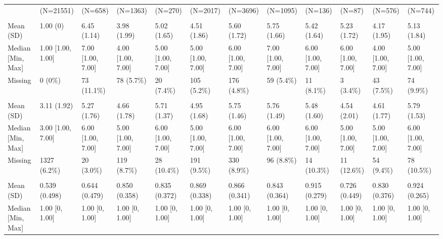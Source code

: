 \documentclass[
  single column]{article}
\begin{document}
\begin{landscape}
\begin{longtable}[t]{llllllllllll}
\endfoot
\bottomrule
\endlastfoot
 & (N=21551) & (N=658) & (N=1363) & (N=270) & (N=2017) & (N=3696) & (N=1095) & (N=136) & (N=87) & (N=576) & (N=744)\\
\addlinespace[0.3em]
\multicolumn{12}{l}{\textbf{Religious Identification Level}}\\
\hspace{1em}Mean (SD) & 1.00 (0) & 6.45 (1.14) & 3.98 (1.99) & 5.02 (1.65) & 4.51 (1.86) & 5.60 (1.72) & 5.75 (1.66) & 5.42 (1.64) & 5.23 (1.72) & 4.17 (1.95) & 5.13 (1.84)\\
\hspace{1em}Median [Min, Max] & 1.00 [1.00, 1.00] & 7.00 [1.00, 7.00] & 4.00 [1.00, 7.00] & 5.00 [1.00, 7.00] & 5.00 [1.00, 7.00] & 6.00 [1.00, 7.00] & 7.00 [1.00, 7.00] & 6.00 [1.00, 7.00] & 6.00 [1.00, 7.00] & 4.00 [1.00, 7.00] & 5.00 [1.00, 7.00]\\
\hspace{1em}Missing & 0 (0\%) & 73 (11.1\%) & 78 (5.7\%) & 20 (7.4\%) & 105 (5.2\%) & 176 (4.8\%) & 59 (5.4\%) & 11 (8.1\%) & 3 (3.4\%) & 43 (7.5\%) & 74 (9.9\%)\\
\addlinespace[0.3em]
\multicolumn{12}{l}{\textbf{Spiritual Identification Level}}\\
\hspace{1em}Mean (SD) & 3.11 (1.92) & 5.27 (1.76) & 4.66 (1.78) & 5.71 (1.37) & 4.95 (1.68) & 5.75 (1.46) & 5.76 (1.49) & 5.48 (1.60) & 4.54 (2.01) & 4.61 (1.77) & 5.79 (1.53)\\
\hspace{1em}Median [Min, Max] & 3.00 [1.00, 7.00] & 6.00 [1.00, 7.00] & 5.00 [1.00, 7.00] & 6.00 [1.00, 7.00] & 5.00 [1.00, 7.00] & 6.00 [1.00, 7.00] & 6.00 [1.00, 7.00] & 6.00 [1.00, 7.00] & 5.00 [1.00, 7.00] & 5.00 [1.00, 7.00] & 6.00 [1.00, 7.00]\\
\hspace{1em}Missing & 1327 (6.2\%) & 20 (3.0\%) & 119 (8.7\%) & 28 (10.4\%) & 191 (9.5\%) & 330 (8.9\%) & 96 (8.8\%) & 14 (10.3\%) & 11 (12.6\%) & 54 (9.4\%) & 78 (10.5\%)\\
\addlinespace[0.3em]
\multicolumn{12}{l}{\textbf{Belief in Spirit}}\\
\hspace{1em}Mean (SD) & 0.539 (0.498) & 0.644 (0.479) & 0.850 (0.358) & 0.835 (0.372) & 0.869 (0.338) & 0.866 (0.341) & 0.843 (0.364) & 0.915 (0.279) & 0.726 (0.449) & 0.830 (0.376) & 0.924 (0.265)\\
\hspace{1em}Median [Min, Max] & 1.00 [0, 1.00] & 1.00 [0, 1.00] & 1.00 [0, 1.00] & 1.00 [0, 1.00] & 1.00 [0, 1.00] & 1.00 [0, 1.00] & 1.00 [0, 1.00] & 1.00 [0, 1.00] & 1.00 [0, 1.00] & 1.00 [0, 1.00] & 1.00 [0, 1.00]\\

\end{longtable}
\end{landscape}
\end{document}
